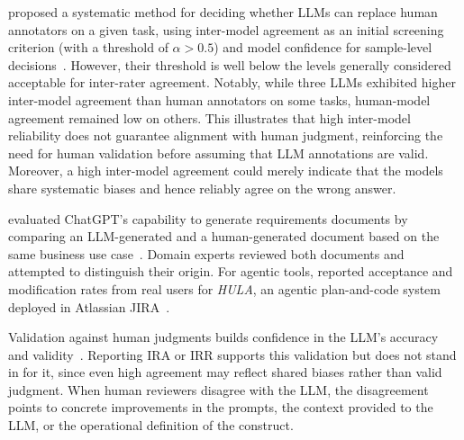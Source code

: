 \citeauthor{DBLP:conf/msr/AhmedDTP25} proposed a systematic method for deciding whether LLMs can replace human annotators on a given task, using inter-model agreement as an initial screening criterion (with a threshold of $\alpha>0.5$) and model confidence for sample-level decisions~\cite{DBLP:conf/msr/AhmedDTP25}. However, their threshold is well below the levels generally considered acceptable for inter-rater agreement.
Notably, while three LLMs exhibited higher inter-model agreement than human annotators on some tasks, human-model agreement remained low on others.
This illustrates that high inter-model reliability does not guarantee alignment with human judgment, reinforcing the need for human validation before assuming that LLM annotations are valid.
Moreover, a high inter-model agreement could merely indicate that the models share systematic biases and hence reliably agree on the wrong answer.

\citeauthor{DBLP:journals/corr/abs-2501-19297} evaluated ChatGPT's capability to generate requirements documents by comparing an LLM-generated and a human-generated document based on the same business use case~\cite{DBLP:journals/corr/abs-2501-19297}. Domain experts reviewed both documents and attempted to distinguish their origin.
For agentic tools, \citeauthor{DBLP:conf/icse-seip/TakerngsaksiriPTTZJLCCW25} reported acceptance and modification rates from real users for \emph{HULA}, an agentic plan-and-code system deployed in Atlassian JIRA~\cite{DBLP:conf/icse-seip/TakerngsaksiriPTTZJLCCW25}.


Validation against human judgments builds confidence in the LLM's accuracy and validity~\cite{khraisha2024canlargelanguagemodelshumans}. Reporting IRA or IRR supports this validation but does not stand in for it, since even high agreement may reflect shared biases rather than valid judgment. When human reviewers disagree with the LLM, the disagreement points to concrete improvements in the prompts, the context provided to the LLM, or the operational definition of the construct.

